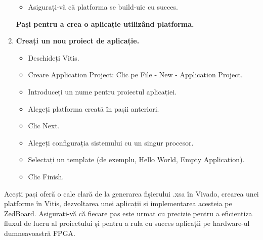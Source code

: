 \documentclass[12pt]{article}
\begin{document}
\begin{enumerate}
\begin{itemize}
            \item Asigurați-vă că platforma se build-uie cu succes.
        \end{itemize}
    \textbf{Pași pentru a crea o aplicație utilizând platforma.}
    \item \textbf{ Creați un nou proiect de aplicație.} 
        \begin{itemize}
            \item Deschideți Vitis.
            \item Creare Application Project: Clic pe File - New - Application Project.
            \item Introduceți un nume pentru proiectul aplicației.
            \item Alegeți platforma creată în pașii anteriori.
            \item Clic Next.
            \item Alegeți configurația sistemului cu un singur procesor.
            \item Selectați un template (de exemplu, Hello World, Empty Application).
            \item Clic Finish.
        \end{itemize}
\end{enumerate}
\hspace*{1cm}Acești pași oferă o cale clară de la generarea fișierului .xsa în Vivado, crearea unei platforme în Vitis, dezvoltarea unei aplicații și implementarea acesteia pe ZedBoard. Asigurați-vă că fiecare pas este urmat cu precizie pentru a eficientiza fluxul de lucru al proiectului și pentru a rula cu succes aplicații pe hardware-ul dumneavoastră FPGA.
\end{document}
